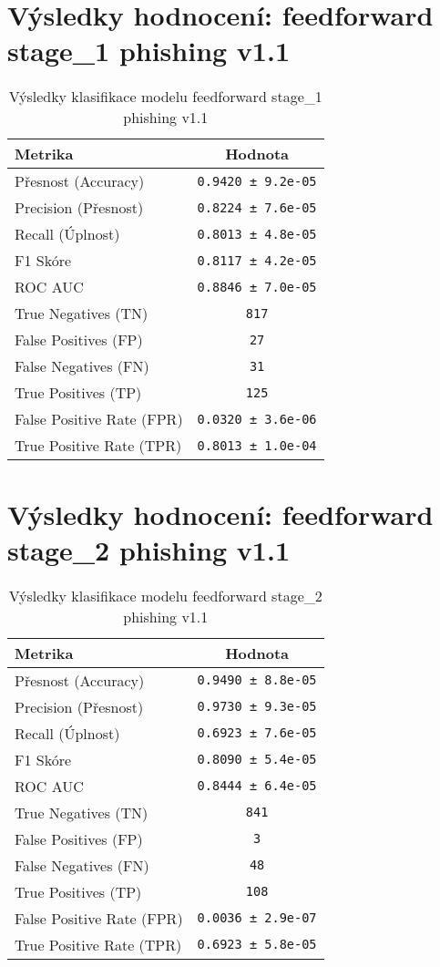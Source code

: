 \section*{Výsledky hodnocení: feedforward stage_1 phishing v1.1}
\begin{table}[h!]
\centering
\begin{tabular}{|l|c|}
\hline
\textbf{Metrika} & \textbf{Hodnota} \\
\hline
Přesnost (Accuracy) & \texttt{0.9420 ± 9.2e-05} \\
Precision (Přesnost) & \texttt{0.8224 ± 7.6e-05} \\
Recall (Úplnost) & \texttt{0.8013 ± 4.8e-05} \\
F1 Skóre & \texttt{0.8117 ± 4.2e-05} \\
ROC AUC & \texttt{0.8846 ± 7.0e-05} \\
True Negatives (TN) & \texttt{817} \\
False Positives (FP) & \texttt{27} \\
False Negatives (FN) & \texttt{31} \\
True Positives (TP) & \texttt{125} \\
False Positive Rate (FPR) & \texttt{0.0320 ± 3.6e-06} \\
True Positive Rate (TPR) & \texttt{0.8013 ± 1.0e-04} \\
\hline
\end{tabular}
\caption{Výsledky klasifikace modelu feedforward stage_1 phishing v1.1}
\label{tab:phishing_feedforward}
\end{table}

\section*{Výsledky hodnocení: feedforward stage_2 phishing v1.1}
\begin{table}[h!]
\centering
\begin{tabular}{|l|c|}
\hline
\textbf{Metrika} & \textbf{Hodnota} \\
\hline
Přesnost (Accuracy) & \texttt{0.9490 ± 8.8e-05} \\
Precision (Přesnost) & \texttt{0.9730 ± 9.3e-05} \\
Recall (Úplnost) & \texttt{0.6923 ± 7.6e-05} \\
F1 Skóre & \texttt{0.8090 ± 5.4e-05} \\
ROC AUC & \texttt{0.8444 ± 6.4e-05} \\
True Negatives (TN) & \texttt{841} \\
False Positives (FP) & \texttt{3} \\
False Negatives (FN) & \texttt{48} \\
True Positives (TP) & \texttt{108} \\
False Positive Rate (FPR) & \texttt{0.0036 ± 2.9e-07} \\
True Positive Rate (TPR) & \texttt{0.6923 ± 5.8e-05} \\
\hline
\end{tabular}
\caption{Výsledky klasifikace modelu feedforward stage_2 phishing v1.1}
\label{tab:phishing_feedforward}
\end{table}

